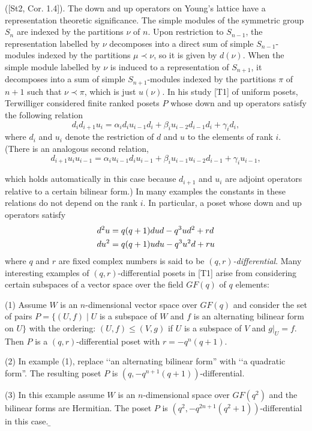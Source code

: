       ([St2, Cor. 1.4]). 
      \m
      The down and up operators on Young's lattice  have a representation
      theoretic significance.  The simple modules of the symmetric group
      $S_n$ are indexed by the partitions $\nu$ of $n$.  Upon restriction to
      $S_{n-1}$, the representation labelled by $\nu$
      decomposes into a direct sum of simple $S_{n-1}$-modules
      indexed by the
      partitions
      $\mu \prec \nu$, so it is given by $d(\nu)$.  When the
      simple module labelled by $\nu$ is induced to a representation
      of $S_{n+1}$, it decomposes into a sum of simple $S_{n+1}$-modules indexed by
      the partitions $\pi$ of $n+1$ such that $\nu \prec \pi$,  which is just
      $u(\nu)$.    
      \m 
      In his study [T1] of
      uniform posets, Terwilliger considered finite ranked posets $P$
      whose down and up operators satisfy the
      following relation 
      $$ d_{i}d_{i+1}u_{i}=\alpha _{i}d_{i}u_{i-1}d_{i}+\beta
      _{i}u_{i-2}d_{i-1}d_{i} +\gamma _{i}d_{i}, $$
      \n where $d_{i}$ and $u_{i}$ denote the restriction of $d$ and $u$ to the
      elements of rank $i$. (There is an analogous second relation,
      $$ d_{i+1}u_{i}u_{i-1}=\alpha _{i}u_{i-1}d_{i}u_{i-1}+\beta
      _{i}u_{i-1}u_{i-2}d_{i-1} +\gamma _{i}u_{i-1}, $$
       
      \n which holds automatically in this case because $d_{i+1}$ and $u_i$ are
      adjoint operators relative to a certain bilinear form.)
      In many examples the constants in these relations do not
      depend on the rank $i$.   In particular, a poset whose down and up
      operators satisfy
      $$
      \aligned
      d^{2}u & = q(q+1)dud -q^{3}ud^{2}+rd \\
      du^2 & = q(q+1)udu - q^3 u^2 d + r u \\
      \endaligned $$
      \n where $q$ and $r$ are fixed complex numbers is 
      said to be  {\it $(q,r)$-differential}.   Many interesting
      examples of $(q,r)$-differential posets in [T1] arise
      from considering certain subspaces of a vector space over the
      field $GF(q)$ of $q$ elements:
      \m
      \item{(1)} Assume $W$ is an $n$-dimensional vector space over
      $GF(q)$ and consider the set of pairs $P = \{(U,f) \mid U$ is
      a subspace of $W$ and $f$ is an alternating bilinear form on $U\}$
      with the ordering:  $(U,f) \leq (V,g)$  if $U$ is a subspace of $V$
      and $g|_U = f$.  Then $P$ is a $(q,r)$-differential poset
      with $r = -q^n(q+1)$. 
      \m
      \item{(2)} In example (1),  replace ‘‘an alternating bilinear form'' with
      ‘‘a quadratic form''.  The resulting poset $P$ is $(q,
      -q^{n+1}(q+1))$-differential.
      \m
      \item{(3)} In this example assume $W$ is an $n$-dimensional space over
      $GF(q^2)$ and the bilinear forms are Hermitian. The poset
      $P$ is $(q^{2},-q^{2n+1}(q^{2}+1))$-differential in this case.
      \b 
       \endsubhead 
      \m
       
